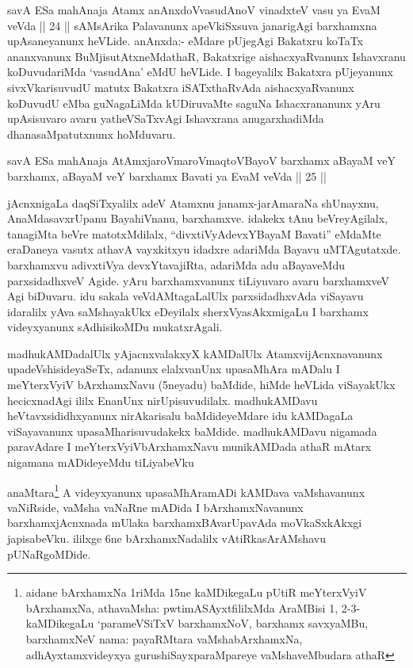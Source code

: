 \begin{artha}
savA ESa mahAnaja Atamx anAnxdoVvasudAnoV vinadxteV vasu ya EvaM veVda || 24 || sAMsArika Palavanunx apeVkiSxsuva janarigAgi barxhamxna upAsaneyanunx heVLide. anAnxda:- eMdare pUjegAgi Bakatxru koTaTx ananxvanunx BuMjisutAtxneMdathaR, Bakatxrige aishacxyaRvanunx Ishavxranu koDuvudariMda `vasudAna' eMdU heVLide. I bageyalilx Bakatxra pUjeyanunx sivxVkarisuvudU matutx Bakatxra iSATxthaRvAda aishacxyaRvanunx koDuvudU eMba guNagaLiMda kUDiruvaMte saguNa Ishacxrananunx yAru upAsisuvaro avaru yatheVSaTxvAgi Ishavxrana anugarxhadiMda dhanasaMpatutxnunx hoMduvaru. 

savA ESa mahAnaja AtAmx\s jaroV\s maroV\s maqtoV\s BayoV barxhamx aBayaM veY barxhamx, aBayaM veY barxhamx Bavati ya EvaM veVda || 25 ||
\end{artha}


\begin{artha}
jAcnxnigaLa daqSiTxyalilx adeV Atamxnu janamx-jarAmaraNa shUnayxnu, AnaMdasavxrUpanu BayahiVnanu, barxhamxve. idakekx tAnu beVreyAgilalx, tanagiMta beVre matotxMdilalx, ``divxtiVyAdevxYBayaM Bavati''  eMdaMte eraDaneya vasutx athavA vayxkitxyu idadxre adariMda Bayavu uMTAgutatxde. barxhamxvu adivxtiVya devxYtavajiRta, adariMda adu aBayaveMdu parxsidadhxveV Agide. yAru barxhamxvanunx tiLiyuvaro avaru barxhamxveV Agi biDuvaru. idu sakala veVdAMtagaLalUlx parxsidadhxvAda viSayavu idaralilx yAva saMshayakUkx eDeyilalx sherxVyasAkxmigaLu I barxhamx videyxyanunx sAdhisikoMDu mukatxrAgali.
\end{artha}



\begin{artha}
madhukAMDadalUlx yAjacnxvalakxyX kAMDalUlx AtamxvijAcnxnavanunx upadeVshisideyaSeTx, adanunx elalxvanUnx upasaMhAra mADalu I meYterxVyiV bArxhamxNavu (5neyadu) baMdide, hiMde heVLida viSayakUkx hecicxnadAgi ililx EnanUnx nirUpisuvudilalx. madhukAMDavu heVtavxsididhxyanunx nirAkarisalu baMdideyeMdare idu kAMDagaLa viSayavanunx upasaMharisuvudakekx baMdide. madhukAMDavu nigamada paravAdare I meYterxVyiVbArxhamxNavu munikAMDada athaR mAtarx nigamana mADideyeMdu tiLiyabeVku
\end{artha}

\begin{artha}
anaMtara\footnote{aidane bArxhamxNa 1riMda 15ne kaMDikegaLu pUtiR meYterxVyiV bArxhamxNa, athavaMsha: pwtimASAyxtf\ndash  ililxMda AraMBisi 1, 2-3- kaMDikegaLu `parameVSiTxV barxhamxNoV, barxhamx savxyaMBu, barxhamxNeV nama: payaRMtara vaMshabArxhamxNa, adhAyxtamxvideyxya gurushiSayxparaMpareye vaMshaveMbudara athaR} A videyxyanunx upasaMhAramADi kAMDava vaMshavanunx vaNiRside, vaMsha vaNaRne mADida I bArxhamxNavanunx barxhamxjAcnxnada mUlaka barxhamxBAvarUpavAda moVkaSxkAkxgi japisabeVku. ililxge 6ne bArxhamxNadalilx vAtiRkasArAMshavu pUNaRgoMDide.
\end{artha}

